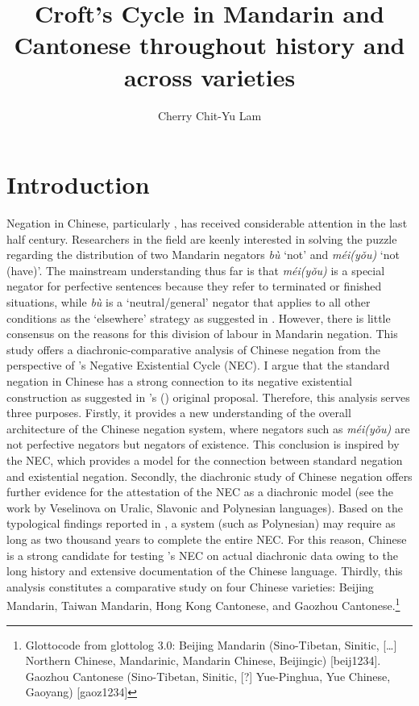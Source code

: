 \documentclass[output=paper]{langscibook}
\author{Cherry Chit-Yu Lam \affiliation{The Open University of Hong Kong}}
\title{Croft's Cycle in Mandarin and Cantonese throughout history and across varieties}
\begin{document}
 
\maketitle

\section{Introduction}\label{s:lam1} 

Negation in Chinese, particularly , has received considerable attention in the last half century. Researchers in the field are keenly interested in solving the puzzle regarding the distribution of two Mandarin negators \textit{bù} `not' and \textit{méi(yǒu)} `not (have)'. The mainstream understanding thus far is that \textit{méi(yǒu)} is a special negator for perfective sentences because they refer to terminated or finished situations, while \textit{bù} is a `neutral/general' negator that applies to all other conditions as the `elsewhere' strategy as suggested in \cite{LiThompson1981}. However, there is little consensus on the reasons for this division of labour in Mandarin negation. This study offers a diachronic-comparative analysis of Chinese negation from the perspective of \citeauthor{Croft1991}'s Negative Existential Cycle (NEC). I argue that the standard negation in Chinese has a strong connection to its negative existential construction as suggested in \citeauthor{Croft1991}'s (\citeyear{Croft1991}) original proposal. Therefore, this analysis serves three purposes. Firstly, it provides a new understanding of the overall architecture of the Chinese negation system, where negators such as \textit{méi(yǒu)} are not perfective negators but negators of existence. This conclusion is inspired by the NEC, which provides a model for the connection between standard negation and existential negation. Secondly, the diachronic study of Chinese negation offers further evidence for the attestation of the NEC as a diachronic model (see the work by Veselinova on Uralic, Slavonic and Polynesian languages). Based on the typological findings reported in \cite{Veselinova2014}, a system (such as Polynesian) may require as long as two thousand years to complete the entire NEC. For this reason, Chinese is a strong candidate for testing \citeauthor{Croft1991}'s NEC on actual diachronic data owing to the long history and extensive documentation of the Chinese language. Thirdly, this analysis constitutes a comparative study on four Chinese varieties: Beijing Mandarin, Taiwan Mandarin, Hong Kong Cantonese, and Gaozhou Cantonese.\footnote{Glottocode from glottolog 3.0: Beijing Mandarin (Sino-Tibetan, Sinitic, […] Northern Chinese, Mandarinic, Mandarin Chinese, Beijingic) [beij1234]. Gaozhou Cantonese (Sino-Tibetan, Sinitic, [?] Yue-Pinghua, Yue Chinese, Gaoyang) [gaoz1234]}
\end{document}
